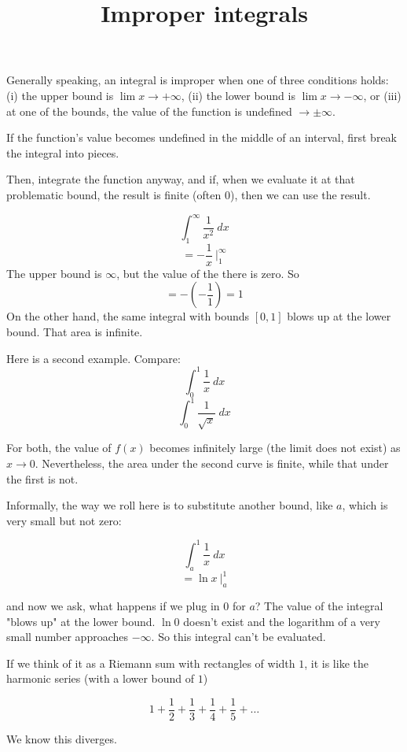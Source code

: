 \documentclass[11pt, oneside]{article}
\title{Improper integrals}
\date{}
\begin{document}
\maketitle
\Large


\label{sec:Improper_integrals}

Generally speaking, an integral is improper when one of three conditions holds:  (i) the upper bound is $\lim x \rightarrow + \infty$, (ii) the lower bound is $\lim x \rightarrow - \infty$, or (iii) at one of the bounds, the value of the function is undefined $\rightarrow \pm \infty$.  

If the function's value becomes undefined in the middle of an interval, first break the integral into pieces.

Then, integrate the function anyway, and if, when we evaluate it at that problematic bound, the result is finite (often $0$), then we can use the result.

\[ \int_1^{\infty} \frac{1}{x^2} \ dx \]
\[ = - \frac{1}{x} \ \bigg |_1^{\infty}  \]
The upper bound is $\infty$, but the value of the there is zero.  So
\[ = - (- \frac{1}{1}) = 1  \]
On the other hand, the same integral with bounds $[0,1]$ blows up at the lower bound.  That area is infinite.

Here is a second example.  Compare:
\[ \int_0^1 \frac{1}{x} \ dx \]
\[ \int_0^1 \frac{1}{\sqrt{x}} \ dx \]

For both, the value of $f(x)$ becomes infinitely large (the limit does not exist) as $x \rightarrow 0$.  Nevertheless, the area under the second curve is finite, while that under the first is not.

Informally, the way we roll here is to substitute another bound, like $a$, which is very small but not zero:

\[ \int_a^1 \frac{1}{x} \ dx \]
\[ = \ln x \ \bigg |_a^1 \]
    
and now we ask, what happens if we plug in $0$ for $a$?  The value of the integral "blows up" at the lower bound.  $\ln 0$ doesn't exist and the logarithm of a very small number approaches $- \infty$.  So this integral can't be evaluated.

If we think of it as a Riemann sum with rectangles of width $1$, it is like the harmonic series (with a lower bound of $1$)

\[ 1 + \frac{1}{2} + \frac{1}{3} + \frac{1}{4} + \frac{1}{5} + \dots \]

We know this diverges.
\end{document}
